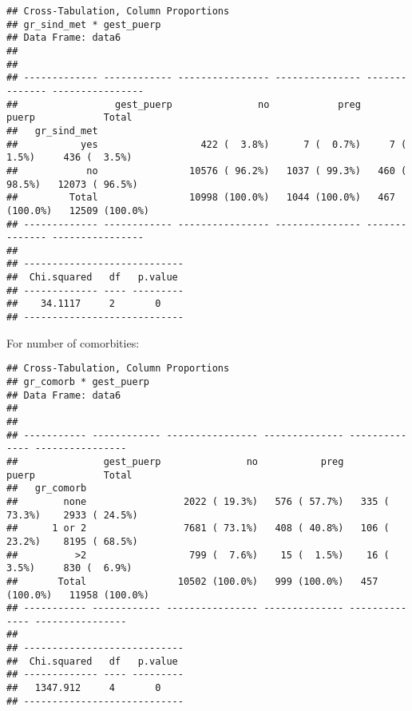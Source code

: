 \documentclass[
]{article}
\newenvironment{Shaded}{\begin{snugshade}}{\end{snugshade}}
\newcommand{\DataTypeTok}[1]{\textcolor[rgb]{0.13,0.29,0.53}{#1}}
\newcommand{\KeywordTok}[1]{\textcolor[rgb]{0.13,0.29,0.53}{\textbf{#1}}}
\newcommand{\NormalTok}[1]{#1}
\newcommand{\OperatorTok}[1]{\textcolor[rgb]{0.81,0.36,0.00}{\textbf{#1}}}
\newcommand{\OtherTok}[1]{\textcolor[rgb]{0.56,0.35,0.01}{#1}}
\newcommand{\StringTok}[1]{\textcolor[rgb]{0.31,0.60,0.02}{#1}}
\begin{document}
\begin{verbatim}
## Cross-Tabulation, Column Proportions  
## gr_sind_met * gest_puerp  
## Data Frame: data6  
## 
## 
## ------------- ------------ ---------------- --------------- -------------- ----------------
##                 gest_puerp               no            preg          puerp            Total
##   gr_sind_met                                                                              
##           yes                  422 (  3.8%)      7 (  0.7%)     7 (  1.5%)     436 (  3.5%)
##            no                10576 ( 96.2%)   1037 ( 99.3%)   460 ( 98.5%)   12073 ( 96.5%)
##         Total                10998 (100.0%)   1044 (100.0%)   467 (100.0%)   12509 (100.0%)
## ------------- ------------ ---------------- --------------- -------------- ----------------
## 
## ----------------------------
##  Chi.squared   df   p.value 
## ------------- ---- ---------
##    34.1117     2       0    
## ----------------------------
\end{verbatim}

For number of comorbities:

\begin{Shaded}
\end{Shaded}

\begin{verbatim}
## Cross-Tabulation, Column Proportions  
## gr_comorb * gest_puerp  
## Data Frame: data6  
## 
## 
## ----------- ------------ ---------------- -------------- -------------- ----------------
##               gest_puerp               no           preg          puerp            Total
##   gr_comorb                                                                             
##        none                 2022 ( 19.3%)   576 ( 57.7%)   335 ( 73.3%)    2933 ( 24.5%)
##      1 or 2                 7681 ( 73.1%)   408 ( 40.8%)   106 ( 23.2%)    8195 ( 68.5%)
##          >2                  799 (  7.6%)    15 (  1.5%)    16 (  3.5%)     830 (  6.9%)
##       Total                10502 (100.0%)   999 (100.0%)   457 (100.0%)   11958 (100.0%)
## ----------- ------------ ---------------- -------------- -------------- ----------------
## 
## ----------------------------
##  Chi.squared   df   p.value 
## ------------- ---- ---------
##   1347.912     4       0    
## ----------------------------
\end{verbatim}
\end{document}
